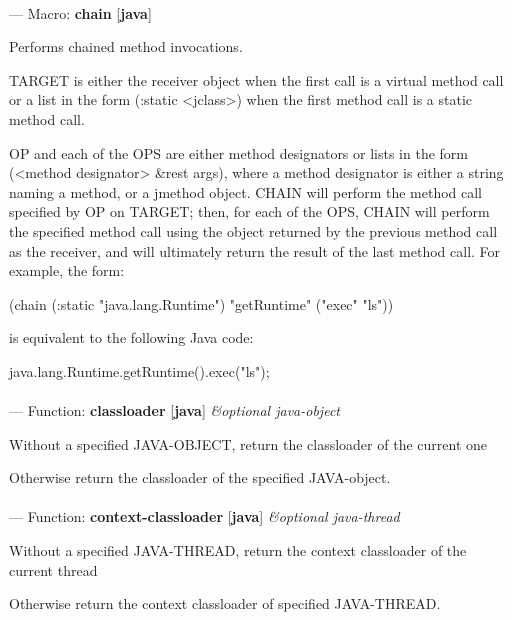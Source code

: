 \paragraph{}
\label{JAVA:CHAIN}
--- Macro: \textbf{chain} [\textbf{java}] \textit{}

\begin{adjustwidth}{5em}{5em}
Performs chained method invocations. 

TARGET is either the receiver object when the first call is a virtual method
call or a list in the form (:static <jclass>) when the first method
call is a static method call. 

OP and each of the OPS are either method designators or lists in the
form (<method designator> \&rest args), where a method designator is
either a string naming a method, or a jmethod object. CHAIN will
perform the method call specified by OP on TARGET; then, for each
of the OPS, CHAIN will perform the specified method call using the
object returned by the previous method call as the receiver, and will
ultimately return the result of the last method call.  For example,
the form:

  (chain (:static "java.lang.Runtime") "getRuntime" ("exec" "ls"))

is equivalent to the following Java code:

  java.lang.Runtime.getRuntime().exec("ls");
\end{adjustwidth}

\paragraph{}
\label{JAVA:CLASSLOADER}
--- Function: \textbf{classloader} [\textbf{java}] \textit{\&optional java-object}

\begin{adjustwidth}{5em}{5em}
Without a specified JAVA-OBJECT, return the classloader of the current one

Otherwise return the classloader of the specified JAVA-object.
\end{adjustwidth}

\paragraph{}
\label{JAVA:CONTEXT-CLASSLOADER}
--- Function: \textbf{context-classloader} [\textbf{java}] \textit{\&optional java-thread}

\begin{adjustwidth}{5em}{5em}
Without a specified JAVA-THREAD, return the context classloader of the current thread

Otherwise return the context classloader of specified JAVA-THREAD.
\end{adjustwidth}


